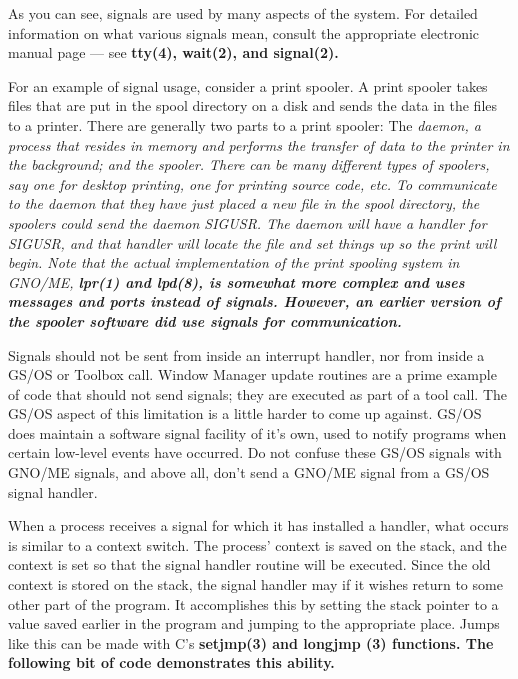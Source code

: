 \documentclass{report}
\begin{document}
As you can see, signals are used by many
aspects of the system. For detailed information on what various
signals mean, consult the appropriate electronic manual page ---
see \bf tty\rm(4), \bf wait\rm(2), and \bf signal\rm(2).

For an example of signal usage, consider a
print spooler. A print spooler takes files that are put in the
spool directory on a disk and sends the data in the files to a
printer. There are generally two parts to a print spooler: The 
\it daemon\rm,
a process that resides in memory and performs the transfer of
data to the printer in the background; and the spooler. There can
be many different types of spoolers, say one for desktop
printing, one for printing source code, etc. To communicate to
the daemon that they have just placed a new file in the spool
directory, the spoolers could send the daemon SIGUSR. The daemon
will have a handler for SIGUSR, and that handler will locate the
file and set things up so the print will begin. Note that the
actual implementation of the print spooling system in GNO/ME,
\bf lpr\rm(1) and \bf lpd\rm(8), 
is somewhat more complex and uses messages and
ports instead of signals. However, an earlier version of the
spooler software \it did \rm use signals for communication.

Signals should not be sent from inside an
interrupt handler, nor from inside a GS/OS or Toolbox call.
Window Manager update routines are a prime example of code that
should not send signals; they are executed as part of a tool
call. The GS/OS aspect of this limitation is a little harder to
come up against. GS/OS does maintain a software signal facility
of it's own, used to notify programs when certain low-level
events have occurred. Do not confuse these GS/OS signals with
GNO/ME signals, and above all, don't send a GNO/ME signal from a
GS/OS signal handler.

When a process receives a signal for which
it has installed a handler, what occurs is similar to a 
context switch. The process' context is saved on the stack, and the
context is set so that the signal handler routine will be
executed. Since the old context is stored on the stack, the
signal handler may if it wishes return to some other part of the
program. It accomplishes this by setting the stack pointer to a
value saved earlier in the program and jumping to the appropriate
place. Jumps like this can be made with C's 
\bf setjmp\rm(3) and \bf longjmp \rm(3)
functions. The following bit of code demonstrates this ability.
\end{document}
